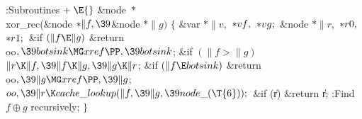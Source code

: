 \Y\B\4:Subroutines\X${}\mathrel+\E{}$\6
\&{node} ${}{*}{}$\\{xor\_rec}(\&{node} ${}{*}\|f,\39{}$\&{node} ${}{*}\|g){}$%
\1\1\2\2\6
${}\{{}$\1\6
\&{var} ${}{*}\|v,{}$ ${}{*}\\{vf},{}$ ${}{*}\\{vg};{}$\6
\&{node} ${}{*}\|r,{}$ ${}{*}\\{r0},{}$ ${}{*}\\{r1};{}$\7
\&{if} ${}(\|f\E\|g){}$\1\5
\&{return} \\{oo}${},\39\\{botsink}\MG\\{xref}\PP,\39\\{botsink}{}$;\2\6
\&{if} ${}(\|f>\|g){}$\1\5
${}\|r\K\|f,\39\|f\K\|g,\39\|g\K\|r{}$;\2\6
\&{if} ${}(\|f\E\\{botsink}){}$\1\5
\&{return} \\{oo}${},\39\|g\MG\\{xref}\PP,\39\|g{}$;\2\6
${}\\{oo},\39\|r\K\\{cache\_lookup}(\|f,\39\|g,\39\\{node\_}(\T{6}));{}$\6
\&{if} (\|r)\1\5
\&{return} \|r;\2\6
:Find $f\oplus g$ recursively\X;\6
\4${}\}{}$\2\par
\fi

